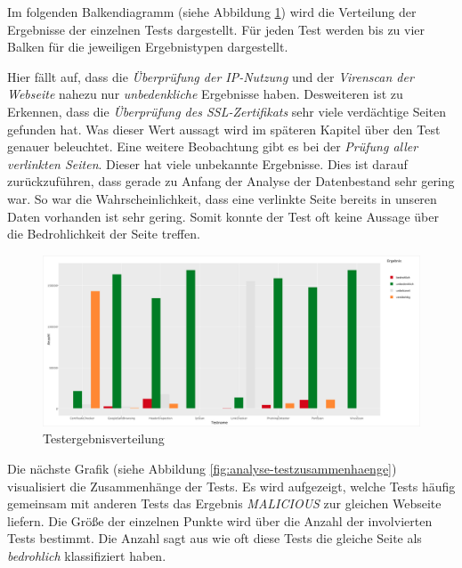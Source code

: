 Im folgenden Balkendiagramm (siehe Abbildung \ref{fig:analyse-ergebnisverteilung}) wird die Verteilung der Ergebnisse der einzelnen Tests dargestellt. Für jeden Test werden bis zu vier Balken für die jeweiligen Ergebnistypen dargestellt.

Hier fällt auf, dass die \textit{Überprüfung der IP-Nutzung} und der \textit{Virenscan der Webseite} nahezu nur \textit{unbedenkliche} Ergebnisse haben. Desweiteren ist zu Erkennen, dass die \textit{Überprüfung des SSL-Zertifikats} sehr viele verdächtige Seiten gefunden hat. Was dieser Wert aussagt wird im späteren Kapitel über den Test genauer beleuchtet. Eine weitere Beobachtung gibt es bei der \textit{Prüfung aller verlinkten Seiten}. Dieser hat viele unbekannte Ergebnisse. Dies ist darauf zurückzuführen, dass gerade zu Anfang der Analyse der Datenbestand sehr gering war. So war die Wahrscheinlichkeit, dass eine verlinkte Seite bereits in unseren Daten vorhanden ist sehr gering. Somit konnte der Test oft keine Aussage über die Bedrohlichkeit der Seite treffen.

\begin{figure}[H]
  \centering
  \includegraphics[width=\textwidth]{images/stats/ergebnisverteilung}
  \caption[Testergebnisverteilung]{Testergebnisverteilung\protect\footnotemark}
  \label{fig:analyse-ergebnisverteilung}
\end{figure}

Die nächste Grafik (siehe Abbildung \ref{fig:analyse-testzusammenhaenge}) visualisiert die Zusammenhänge der Tests. Es wird aufgezeigt, welche Tests häufig gemeinsam mit anderen Tests das Ergebnis \textit{MALICIOUS} zur gleichen Webseite liefern. Die Größe der einzelnen Punkte wird über die Anzahl der involvierten Tests bestimmt. Die Anzahl sagt aus wie oft diese Tests die gleiche Seite als \textit{bedrohlich} klassifiziert haben.

